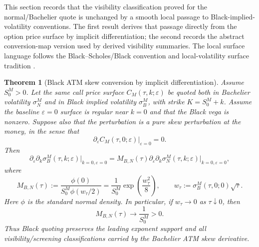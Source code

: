 \documentclass[11pt,a4paper]{amsart}
\theoremstyle{plain}
\newtheorem{theorem}{Theorem}[section]
\theoremstyle{definition}
\theoremstyle{remark}
\begin{document}
This section records that the visibility classification proved for the normal/Bachelier quote is
unchanged by a smooth local passage to Black-implied-volatility conventions.  The first result
derives that passage directly from the option price surface by implicit differentiation; the second
records the abstract conversion-map version used by derived visibility summaries.  The local surface
language follows the Black--Scholes/Black convention and local-volatility surface tradition
\cite{blackScholes1973,black1976,dupire1994}.

\begin{theorem}[Black ATM skew conversion by implicit differentiation]\label{thm:self-contained-black}
Assume \(S_0^M>0\).  Let the same call price surface \(C_M(\tau,k;\varepsilon)\) be quoted both in
Bachelier volatility \(\sigma_N^M\) and in Black implied volatility \(\sigma_B^M\), with strike
\(K=S_0^M+k\).  Assume the baseline \(\varepsilon=0\) surface is regular near \(k=0\) and that the
Black vega is nonzero.  Suppose also that the perturbation is a pure skew perturbation at the
money, in the sense that
\[
        \partial_\varepsilon C_M(\tau,0;\varepsilon)\big|_{\varepsilon=0}=0 .
\]
Then
\[
        \partial_\varepsilon\partial_k\sigma_B^M(\tau,k;\varepsilon)
        \big|_{k=0,\varepsilon=0}
        =
        M_{B,N}(\tau)
        \partial_\varepsilon\partial_k\sigma_N^M(\tau,k;\varepsilon)
        \big|_{k=0,\varepsilon=0},
\]
where
\[
        M_{B,N}(\tau)
        :=
        \frac{\phi(0)}{S_0^M\phi(w_\tau/2)}
        =
        \frac{1}{S_0^M}\exp\!\left(\frac{w_\tau^2}{8}\right),
        \qquad
        w_\tau:=\sigma_B^M(\tau,0;0)\sqrt\tau .
\]
Here \(\phi\) is the standard normal density.
In particular, if \(w_\tau\to0\) as \(\tau\downarrow0\), then
\[
        M_{B,N}(\tau)\to \frac1{S_0^M}>0.
\]
Thus Black quoting preserves the leading exponent support and all visibility/screening
classifications carried by the Bachelier ATM skew derivative.
\end{theorem}
\end{document}
